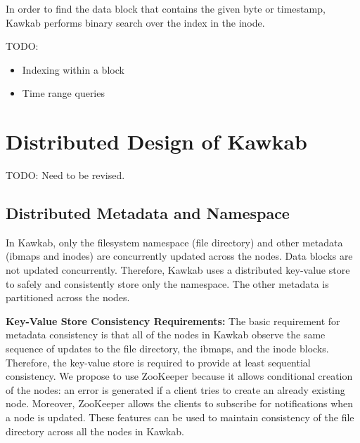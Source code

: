 \documentclass[]{article}
\newcommand{\subtopic}[1]{\vspace{1.5pt} \noindent \textbf{#1}}
\newcommand{\hl}[1]{\textcolor{notecolor}{#1}}
\begin{document}
{In order to find the data block that contains the given byte or timestamp, Kawkab
performs binary search over the index in the inode.

TODO:

\begin{itemize}
  \item Indexing within a block
  \item Time range queries
\end{itemize}




\section{Distributed Design of Kawkab}

\hl{TODO: Need to be revised.}

\subsection{Distributed Metadata and Namespace}

In Kawkab, only the filesystem namespace (file directory) and other metadata
(ibmaps and inodes) are concurrently updated across the nodes. Data blocks are
not updated concurrently. Therefore, Kawkab uses a distributed key-value store
to safely and consistently store only the namespace. The other metadata
is partitioned across the nodes.

\subtopic{Key-Value Store Consistency Requirements:} The basic requirement for
metadata consistency is that all of the nodes in Kawkab observe the same
sequence of updates to the file directory, the ibmaps, and the inode blocks.  
Therefore, the key-value store is required to provide at least sequential
consistency.
We propose to use ZooKeeper because it allows conditional creation of the
nodes: an error is generated if a client tries to create an already existing
node. Moreover, ZooKeeper allows the clients to subscribe for notifications
when a node is updated.  These features can be used to maintain consistency
of the file directory across all the nodes in Kawkab.


}
\end{document}
